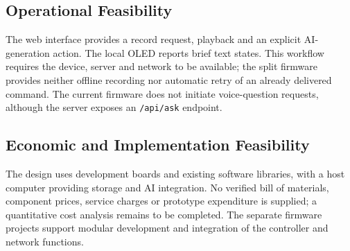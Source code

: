 \subsection{Operational Feasibility}
The web interface provides a record request, playback and an explicit AI-generation action. The local OLED reports brief text states. This workflow requires the device, server and network to be available; the split firmware provides neither offline recording nor automatic retry of an already delivered command. The current firmware does not initiate voice-question requests, although the server exposes an \texttt{/api/ask} endpoint.

\subsection{Economic and Implementation Feasibility}
The design uses development boards and existing software libraries, with a host computer providing storage and AI integration. No verified bill of materials, component prices, service charges or prototype expenditure is supplied; a quantitative cost analysis remains to be completed. The separate firmware projects support modular development and integration of the controller and network functions.
